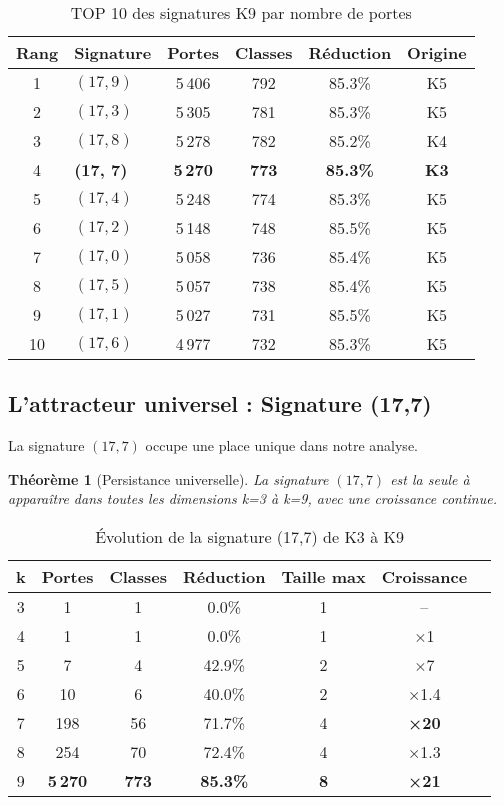 \documentclass[12pt,a4paper]{article}
\newtheorem{theorem}{Théorème}[section]
\theoremstyle{remark}
\begin{document}
\begin{table}[h]
\centering
\caption{TOP 10 des signatures K9 par nombre de portes}
\label{tab:top10k9}
\begin{tabular}{clcccc}
\toprule
\textbf{Rang} & \textbf{Signature} & \textbf{Portes} & \textbf{Classes} & \textbf{Réduction} & \textbf{Origine}\\
\midrule
1 & $(17, 9)$ & 5\,406 & 792 & 85.3\% & K5\\
2 & $(17, 3)$ & 5\,305 & 781 & 85.3\% & K5\\
3 & $(17, 8)$ & 5\,278 & 782 & 85.2\% & K4\\
4 & \textbf{(17, 7)} & \textbf{5\,270} & \textbf{773} & \textbf{85.3\%} & \textbf{K3}\\
5 & $(17, 4)$ & 5\,248 & 774 & 85.3\% & K5\\
6 & $(17, 2)$ & 5\,148 & 748 & 85.5\% & K5\\
7 & $(17, 0)$ & 5\,058 & 736 & 85.4\% & K5\\
8 & $(17, 5)$ & 5\,057 & 738 & 85.4\% & K5\\
9 & $(17, 1)$ & 5\,027 & 731 & 85.5\% & K5\\
10 & $(17, 6)$ & 4\,977 & 732 & 85.3\% & K5\\
\bottomrule
\end{tabular}
\end{table}

\subsection{L'attracteur universel : Signature (17,7)}

La signature $(17, 7)$ occupe une place unique dans notre analyse.

\begin{theorem}[Persistance universelle]
La signature $(17, 7)$ est la seule à apparaître dans toutes les dimensions k=3 à k=9, avec une croissance continue.
\end{theorem}

\begin{table}[h]
\centering
\caption{Évolution de la signature (17,7) de K3 à K9}
\label{tab:evo177}
\begin{tabular}{ccccccc}
\toprule
\textbf{k} & \textbf{Portes} & \textbf{Classes} & \textbf{Réduction} & \textbf{Taille max} & \textbf{Croissance}\\
\midrule
3 & 1 & 1 & 0.0\% & 1 & --\\
4 & 1 & 1 & 0.0\% & 1 & ×1\\
5 & 7 & 4 & 42.9\% & 2 & ×7\\
6 & 10 & 6 & 40.0\% & 2 & ×1.4\\
7 & 198 & 56 & 71.7\% & 4 & \textbf{×20}\\
8 & 254 & 70 & 72.4\% & 4 & ×1.3\\
9 & \textbf{5\,270} & \textbf{773} & \textbf{85.3\%} & \textbf{8} & \textbf{×21}\\
\bottomrule
\end{tabular}
\end{table}
\end{document}
